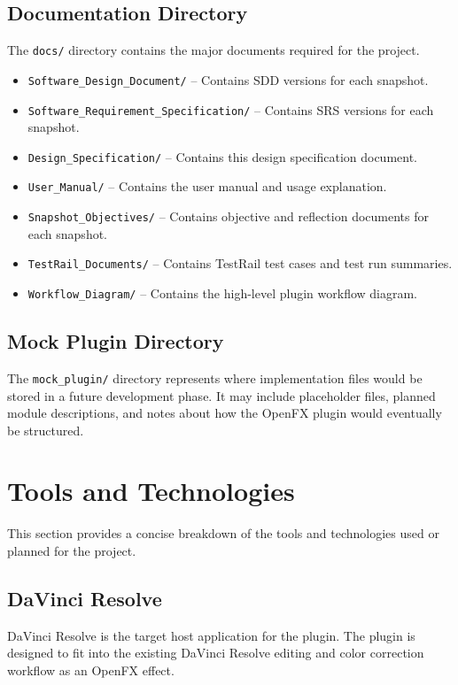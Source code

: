 \documentclass{article}
\begin{document}
\subsection{Documentation Directory}
The \texttt{docs/} directory contains the major documents required for the project.

\begin{itemize}
    \item \texttt{Software\_Design\_Document/} -- Contains SDD versions for each snapshot.
    \item \texttt{Software\_Requirement\_Specification/} -- Contains SRS versions for each snapshot.
    \item \texttt{Design\_Specification/} -- Contains this design specification document.
    \item \texttt{User\_Manual/} -- Contains the user manual and usage explanation.
    \item \texttt{Snapshot\_Objectives/} -- Contains objective and reflection documents for each snapshot.
    \item \texttt{TestRail\_Documents/} -- Contains TestRail test cases and test run summaries.
    \item \texttt{Workflow\_Diagram/} -- Contains the high-level plugin workflow diagram.
\end{itemize}

\subsection{Mock Plugin Directory}
The \texttt{mock\_plugin/} directory represents where implementation files would be stored in a future development phase. It may include placeholder files, planned module descriptions, and notes about how the OpenFX plugin would eventually be structured.

\section{Tools and Technologies}

This section provides a concise breakdown of the tools and technologies used or planned for the project.

\subsection{DaVinci Resolve}
DaVinci Resolve is the target host application for the plugin. The plugin is designed to fit into the existing DaVinci Resolve editing and color correction workflow as an OpenFX effect.
\end{document}
